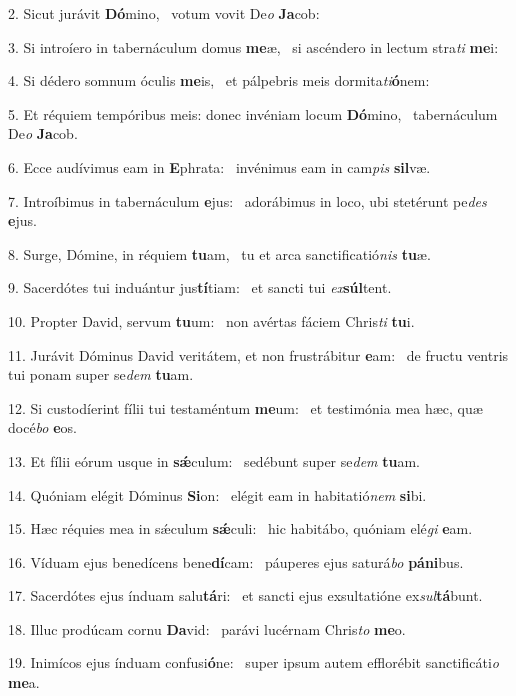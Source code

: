 2. Sicut jurávit \textbf{Dó}mino, \ast\  votum vovit De\textit{o} \textbf{Ja}cob:\

3. Si introíero in tabernáculum domus \textbf{me}æ, \ast\  si ascéndero in lectum stra\textit{ti} \textbf{me}i:\

4. Si dédero somnum óculis \textbf{me}is, \ast\  et pálpebris meis dormita\textit{ti}\textbf{ó}nem:\

5. Et réquiem tempóribus meis: donec invéniam locum \textbf{Dó}mino, \ast\  tabernáculum De\textit{o} \textbf{Ja}cob.\

6. Ecce audívimus eam in \textbf{E}phrata: \ast\  invénimus eam in cam\textit{pis} \textbf{sil}væ.\

7. Introíbimus in tabernáculum \textbf{e}jus: \ast\  adorábimus in loco, ubi stetérunt pe\textit{des} \textbf{e}jus.\

8. Surge, Dómine, in réquiem \textbf{tu}am, \ast\  tu et arca sanctificatió\textit{nis} \textbf{tu}æ.\

9. Sacerdótes tui induántur jus\textbf{tí}tiam: \ast\  et sancti tui \textit{ex}\textbf{súl}tent.\

10. Propter David, servum \textbf{tu}um: \ast\  non avértas fáciem Chris\textit{ti} \textbf{tu}i.\

11. Jurávit Dóminus David veritátem, et non frustrábitur \textbf{e}am: \ast\  de fructu ventris tui ponam super se\textit{dem} \textbf{tu}am.\

12. Si custodíerint fílii tui testaméntum \textbf{me}um: \ast\  et testimónia mea hæc, quæ docé\textit{bo} \textbf{e}os.\

13. Et fílii eórum usque in \textbf{sǽ}culum: \ast\  sedébunt super se\textit{dem} \textbf{tu}am.\

14. Quóniam elégit Dóminus \textbf{Si}on: \ast\  elégit eam in habitatió\textit{nem} \textbf{si}bi.\

15. Hæc réquies mea in sǽculum \textbf{sǽ}culi: \ast\  hic habitábo, quóniam elé\textit{gi} \textbf{e}am.\

16. Víduam ejus benedícens bene\textbf{dí}cam: \ast\  páuperes ejus saturá\textit{bo} \textbf{pá}\textbf{ni}bus.\

17. Sacerdótes ejus índuam salu\textbf{tá}ri: \ast\  et sancti ejus exsultatióne ex\textit{sul}\textbf{tá}bunt.\

18. Illuc prodúcam cornu \textbf{Da}vid: \ast\  parávi lucérnam Chris\textit{to} \textbf{me}o.\

19. Inimícos ejus índuam confusi\textbf{ó}ne: \ast\  super ipsum autem efflorébit sanctificáti\textit{o} \textbf{me}a.\

